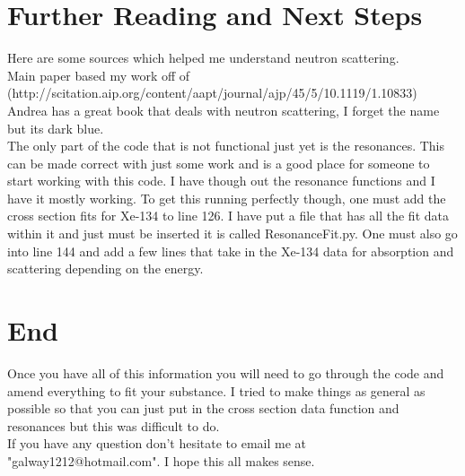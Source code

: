 \documentclass[12pt]{amsart}
\begin{document}
\section{Further Reading and Next Steps}
Here are some sources which helped me understand neutron scattering.\\
\indent Main paper based my work off of (http://scitation.aip.org/content/aapt/journal/ajp/45/5/10.1119/1.10833)\\
Andrea has a great book that deals with neutron scattering, I forget the name but its dark blue.\\
\indent The only part of the code that is not functional just yet is the resonances. This can be made correct with just some work and is a good place for someone to start working with this code. I have though out the resonance functions and I have it mostly working. To get this running perfectly though, one must add the cross section fits for Xe-134 to line 126. I have put a file that has all the fit data within it and just must be inserted it is called ResonanceFit.py. One must also go into line 144 and add a few lines that take in the Xe-134 data for absorption and scattering depending on the energy.
\section{End}
Once you have all of this information you will need to go through the code and amend everything to fit your substance. I tried to make things as general as possible so that you can just put in the cross section data function and resonances but this was difficult to do.\\
\indent If you have any question don't hesitate to email me at "galway1212@hotmail.com". I hope this all makes sense.
\end{document}
